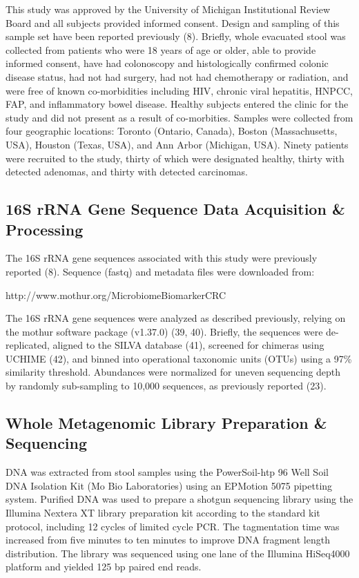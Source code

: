 \documentclass[12pt,]{article}
\begin{document}
This study was approved by the University of Michigan Institutional
Review Board and all subjects provided informed consent. Design and
sampling of this sample set have been reported previously (8). Briefly,
whole evacuated stool was collected from patients who were 18 years of
age or older, able to provide informed consent, have had colonoscopy and
histologically confirmed colonic disease status, had not had surgery,
had not had chemotherapy or radiation, and were free of known
co-morbidities including HIV, chronic viral hepatitis, HNPCC, FAP, and
inflammatory bowel disease. Healthy subjects entered the clinic for the
study and did not present as a result of co-morbities. Samples were
collected from four geographic locations: Toronto (Ontario, Canada),
Boston (Massachusetts, USA), Houston (Texas, USA), and Ann Arbor
(Michigan, USA). Ninety patients were recruited to the study, thirty of
which were designated healthy, thirty with detected adenomas, and thirty
with detected carcinomas.

\subsection{16S rRNA Gene Sequence Data Acquisition \&
Processing}\label{s-rrna-gene-sequence-data-acquisition-processing}

The 16S rRNA gene sequences associated with this study were previously
reported (8). Sequence (fastq) and metadata files were downloaded from:

http://www.mothur.org/MicrobiomeBiomarkerCRC

The 16S rRNA gene sequences were analyzed as described previously,
relying on the mothur software package (v1.37.0) (39, 40). Briefly, the
sequences were de-replicated, aligned to the SILVA database (41),
screened for chimeras using UCHIME (42), and binned into operational
taxonomic units (OTUs) using a 97\% similarity threshold. Abundances
were normalized for uneven sequencing depth by randomly sub-sampling to
10,000 sequences, as previously reported (23).

\subsection{Whole Metagenomic Library Preparation \&
Sequencing}\label{whole-metagenomic-library-preparation-sequencing}

DNA was extracted from stool samples using the PowerSoil-htp 96 Well
Soil DNA Isolation Kit (Mo Bio Laboratories) using an EPMotion 5075
pipetting system. Purified DNA was used to prepare a shotgun sequencing
library using the Illumina Nextera XT library preparation kit according
to the standard kit protocol, including 12 cycles of limited cycle PCR.
The tagmentation time was increased from five minutes to ten minutes to
improve DNA fragment length distribution. The library was sequenced
using one lane of the Illumina HiSeq4000 platform and yielded 125 bp
paired end reads.
\end{document}
